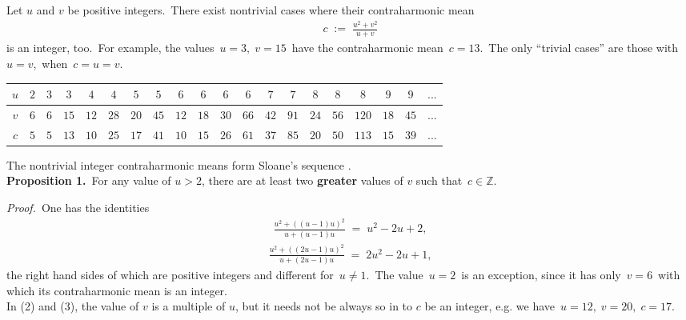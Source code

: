 \documentclass[12pt]{article}
\theoremstyle{definition}
\begin{document}

Let $u$ and $v$ be positive integers.\, There exist nontrivial cases where their contraharmonic mean
\begin{align}
c \;:=\; \frac{u^2\!+\!v^2}{u\!+\!v}
\end{align}
is an integer, too.\, For example, the values\, $u = 3,\; v = 15$\, have the contraharmonic mean\, $c =13$.\, The only ``trivial cases'' are those with\, $u = v$,\, when\, $c = u = v$.\\

\begin{center}
\begin{tabular}{||c||c|c|c|c|c|c|c|c|c|c|c|c|c|c|c|c|c|c|c||}
\hline
$u$ & $2$ & $3$ & $3$ & $4$ & $4$ & $5$ & $5$ & $6$
& $6$ & $6$ & $6$ & $7$ & $7$ & $8$ & $8$ & $8$ & $9$ & $9$ & $...$\\
\hline
$v$ & $6$ & $6$ & $15$ & $12$ & $28$ & $20$ & $45$ & $12$ & $18$
& $30$ & $66$ & $42$ & $91$ & $24$ & $56$ & $120$ & $18$ & $45$ & $...$\\
\hline
$c$ & $5$ & $5$ & $13$ & $10$ & $25$ & $17$ & $41$ & $10$ & $15$
& $26$ & $61$ & $37$ & $85$ & $20$ & $50$& $113$ & $15$ & $39$ & $...$\\
\hline
\end{tabular}
\end{center}

The nontrivial integer contraharmonic means form Sloane's sequence 
.\\

\textbf{Proposition 1.}\, For any value of $u > 2$, there are at least two \textbf{greater} values of $v$ such that\, 
$c \in \mathbb{Z}$.

\emph{Proof.}\, One has the identities
\begin{align}
\frac{u^2\!+\!((u\!-\!1)u)^2}{u+(u\!-\!1)u} \;=\; u^2\!-\!2u\!+\!2,
\end{align}
\begin{align}
\frac{u^2\!+\!((2u\!-\!1)u)^2}{u+(2u\!-\!1)u} \;=\; 2u^2\!-\!2u\!+\!1,
\end{align}
the right hand sides of which are positive integers and different for\, $u \neq 1$.\, The value\, $u = 2$\, is an exception, since it has only\, $v = 6$\, with which its contraharmonic mean is an integer.\\

In (2) and (3), the value of $v$ is a multiple of $u$, but it needs not be always so in  to $c$ be an integer, e.g. we have\, $u = 12,\; v = 20,\; c = 17$.\\
\end{document}
